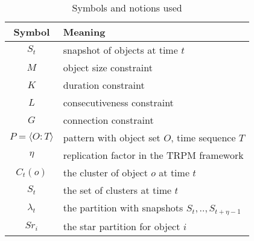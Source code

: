 \begin{table}[h]\scriptsize
\centering
\begin{tabular}{|c|l|} 
\hline
Symbol & Meaning \\
\hline
$S_t$ & snapshot of objects at time $t$ \\
\hline
$M$ & object size constraint \\
\hline 
$K$ & duration constraint\\
\hline
$L$ & consecutiveness constraint\\
\hline
$G$ & connection constraint \\
\hline
$P=\langle O:T \rangle$ & pattern with object set $O$, time sequence $T$\\
\hline
$\eta$ & replication factor in the TRPM framework\\
\hline
$C_t(o)$ & the cluster of object $o$ at time $t$ \\
\hline 
$S_t$ & the set of clusters at time $t$\\
\hline 
$\lambda_t$ & the partition with snapshots $S_t,..,S_{t+\eta-1}$ \\
\hline
$Sr_i $ &  the star partition for object $i$ \\
\hline 
\end{tabular} 
\caption{Symbols and notions used}
\end{table}
